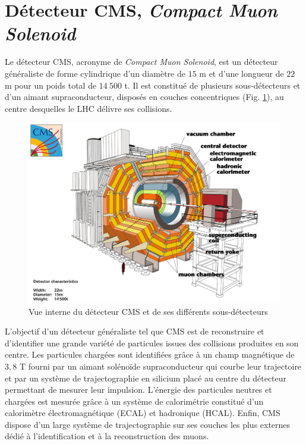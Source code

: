\section{Détecteur CMS, \textit{\uppercase{C}ompact \uppercase{M}uon \uppercase{S}olenoid}}

Le détecteur CMS, acronyme de \textit{Compact Muon Solenoid}, est un détecteur généraliste de forme cylindrique d'un diamètre de $15$ m et d'une longueur de $22$ m pour un poids total de $14~500$ t. Il est constitué de plusieurs sous-détecteurs et d'un aimant supraconducteur, disposés en couches concentriques (Fig. \ref{cms}), au centre desquelles le LHC délivre ses collisions. \\

\begin{figure}
\centering
    \includegraphics[scale=0.5]{Chapitre3/Images/CMS.jpg} 
\caption{Vue interne du détecteur CMS et de ses différents sous-détecteurs}
\label{cms}
\end{figure}

L'objectif d'un détecteur généraliste tel que CMS est de reconstruire et d'identifier une grande variété de particules issues des collisions produites en son centre. Les particules chargées sont identifiées grâce à un champ magnétique de $3,8$ T fourni par un aimant solénoïde supraconducteur qui courbe leur trajectoire et par un système de trajectographie en silicium placé au centre du détecteur permettant de mesurer leur impulsion. L'énergie des particules neutres et chargées est mesurée grâce à un système de calorimétrie constitué d'un calorimètre électromagnétique (ECAL) et hadronique (HCAL). Enfin, CMS dispose d'un large système de trajectographie sur ses couches les plus externes dédié à l'identification et à la reconstruction des muons. 

